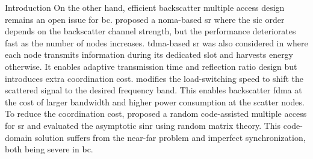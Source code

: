 \documentclass[journal,12pt,onecolumn,draftclsnofoot]{IEEEtran}
\theoremstyle{remark}
\begin{document}
\begin{section}{Introduction}
	On the other hand, efficient backscatter multiple access design remains an open issue for \gls{bc}.
	\cite{Xu2021a} proposed a \gls{noma}-based \gls{sr} where the \gls{sic} order depends on the backscatter channel strength, but the performance deteriorates fast as the number of nodes increases.
	\gls{tdma}-based \gls{sr} was also considered in \cite{Yang2021a} where each node transmits information during its dedicated slot and harvests energy otherwise.
	It enables adaptive transmission time and reflection ratio design but introduces extra coordination cost.
	\cite{Vougioukas2019} modifies the load-switching speed to shift the scattered signal to the desired frequency band.
	This enables backscatter \gls{fdma} at the cost of larger bandwidth and higher power consumption at the scatter nodes.
	To reduce the coordination cost, \cite{Han2021} proposed a random code-assisted multiple access for \gls{sr} and evaluated the asymptotic \gls{sinr} using random matrix theory.
	This code-domain solution suffers from the near-far problem and imperfect synchronization, both being severe in \gls{bc}.


\end{section}
\end{document}
